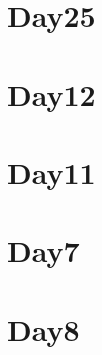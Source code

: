 
\section*{Day25}

\vfill
\section*{Day12}

\vfill
\section*{Day11}

\vfill
\section*{Day7}

\vfill
\section*{Day8}

\vfill
